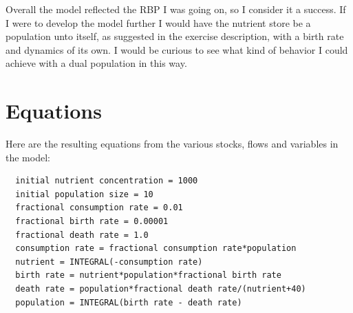 \documentclass[12pt]{article}
\begin{document}
Overall the model reflected the RBP I was going on, so I consider it a success.  If I were to develop the model further I would have the nutrient store be a population unto itself, as suggested in the exercise description, with a birth rate and dynamics of its own.  I would be curious to see what kind of behavior I could achieve with a dual population in this way.  

\section{Equations}

Here are the resulting equations from the various stocks, flows and variables in the model:

\begin{verbatim}
  initial nutrient concentration = 1000
  initial population size = 10
  fractional consumption rate = 0.01
  fractional birth rate = 0.00001
  fractional death rate = 1.0
  consumption rate = fractional consumption rate*population
  nutrient = INTEGRAL(-consumption rate)
  birth rate = nutrient*population*fractional birth rate
  death rate = population*fractional death rate/(nutrient+40)
  population = INTEGRAL(birth rate - death rate)
\end{verbatim}
\end{document}
